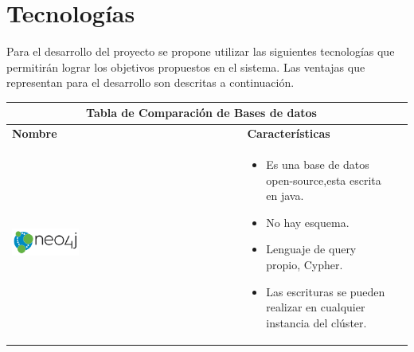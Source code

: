 \section{Tecnologías}
Para el desarrollo del proyecto se propone utilizar las siguientes tecnologías que permitirán lograr los objetivos propuestos en el sistema. Las ventajas que representan para el desarrollo son descritas a continuación.

	\begin{table}[b!]
    \centering
      \begin{tabular}{|p{2cm}|ll}
        \hline
        \multicolumn{2}{|c|}{{\bf Tabla de Comparación de Bases de datos}} \\ 
        \hline
          \multicolumn{1}{|p{4cm}|}{{\bf Nombre}} & 
		  \multicolumn{1}{p{10cm}|}{{\bf Características}}\\

        \hline
          \multicolumn{1}{|p{5cm}|}{\includegraphics[width=0.3\textwidth]{images/neo4j}} & 
          \multicolumn{1}{p{10cm}|}{\begin{itemize}
        \item Es una base de datos open-source,esta escrita en java.
        \item No hay esquema. 
        \item Lenguaje de query propio, Cypher.
        \item Las escrituras se pueden realizar en cualquier instancia del clúster.
      \end{itemize}} \\
         

\end{tabular}
\end{table}

